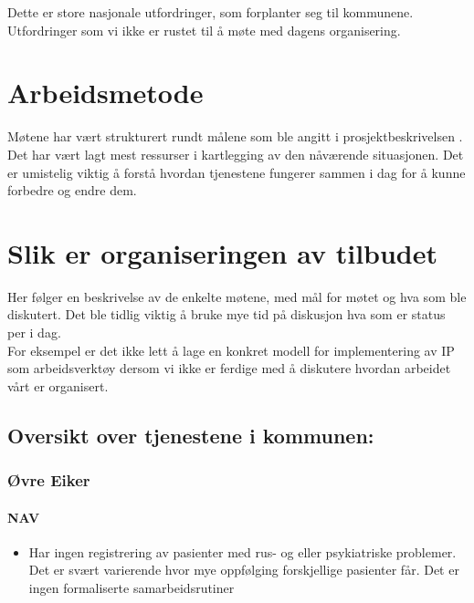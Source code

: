 \documentclass[11pt]{report} %
\begin{document}
                    Dette er store nasjonale utfordringer, som forplanter seg til kommunene. Utfordringer som vi ikke er rustet til å møte med dagens organisering. \\

                \chapter{Arbeidsmetode}\label{chap:meto}
                  Møtene har vært strukturert rundt målene som ble angitt i prosjektbeskrivelsen
                  \cite{ProPlan-1}. Det har vært lagt mest ressurser i kartlegging av den nåværende situasjonen. Det er umistelig viktig å forstå hvordan tjenestene fungerer sammen i dag for å kunne forbedre og endre dem.\\

                \chapter{Slik er organiseringen av tilbudet}\label{chap:org}
                  Her følger en beskrivelse av de enkelte møtene, med mål for møtet og hva som ble diskutert. Det ble tidlig viktig å bruke mye tid på diskusjon hva som er status per i dag.\\
                  For eksempel er det ikke lett å lage en konkret modell for implementering av IP som arbeidsverktøy dersom vi ikke er ferdige med å diskutere hvordan arbeidet vårt er organisert.\\

                  \section{Oversikt over tjenestene i kommunen:}
                   
                  \subsection{Øvre Eiker}\label{sec:org_oek}
                      
                      \subsubsection{NAV}
                        \begin{itemize} 
                          \item Har ingen registrering av pasienter med rus- og eller psykiatriske problemer. Det er svært varierende hvor mye oppfølging forskjellige pasienter får. Det er ingen formaliserte samarbeidsrutiner
                        \end{itemize}
                      
\end{document}
